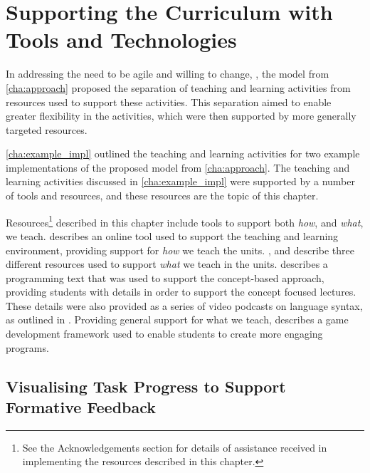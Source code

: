 
\chapter{Supporting the Curriculum with Tools and Technologies} %
\label{cha:supporting}

\graphicspath{{Figures/Supporting/}}

In addressing the need to be agile and willing to change, , the model from \cref{cha:approach} proposed the separation of teaching and learning activities from resources used to support these activities. This separation aimed to enable greater flexibility in the activities, which were then supported by more generally targeted resources.

\cref{cha:example_impl} outlined the teaching and learning activities for two example implementations of the proposed model from \cref{cha:approach}. The teaching and learning activities discussed in \cref{cha:example_impl} were supported by a number of tools and resources, and these resources are the topic of this chapter.

Resources\footnote{See the Acknowledgements section for details of assistance received in implementing the resources described in this chapter.} described in this chapter include tools to support both \emph{how}, and \emph{what}, we teach.  describes an online tool used to support the teaching and learning environment, providing support for \emph{how} we teach the units. ,  and  describe three different resources used to support \emph{what} we teach in the units.  describes a programming text that was used to support the concept-based approach, providing students with details in order to support the concept focused lectures. These details were also provided as a series of video podcasts on language syntax, as outlined in . Providing general support for what we teach,  describes a game development framework used to enable students to create more engaging programs.


\section{Visualising Task Progress to Support Formative Feedback} %
\label{sec:doubtfire}

